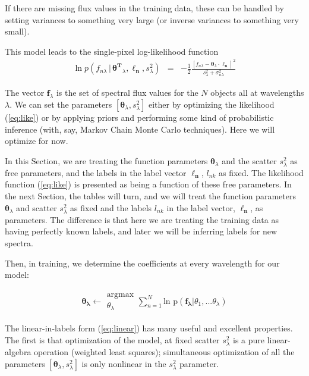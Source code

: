 \documentclass[12pt, preprint]{aastex}
\newcommand{\sectionname}{Section}
\newcommand{\set}[1]{\bm{#1}}
\newcommand{\given}{\,|\,}
\begin{document}
If there are missing flux values in the training data, these can be
handled by setting variances to something very large (or inverse
variances to something very small).

This model leads to the single-pixel log-likelihood function 
\begin{eqnarray}
\ln p(f_{n\lambda}\given\set{\theta^T}_\lambda, \boldsymbol{\ell_n}, s_\lambda^2) &=&
 -\frac{1}{2}\frac{[f_{n\lambda} - \set{\theta}_\lambda \cdot \set{\ell_n}]^2}{s_\lambda^2 + \sigma_{n\lambda}^2}
\label{eq:like}
\end{eqnarray}


The vector $\set{f}_\lambda$ is the set of spectral flux values for
the $N$ objects all at wavelengths $\lambda$.
We can set the parameters $[\set{\theta}_\lambda,s_\lambda^2]$ either by
optimizing the likelihood (\ref{eq:like}) or by applying priors and
performing some kind of probabilistic inference (with, say, Markov
Chain Monte Carlo techniques).
Here we will optimize for now.

In this \sectionname, we are treating the function parameters
$\set{\theta}_\lambda$ and the scatter $s_\lambda^2$ as free parameters, and the
labels in the label vector $\set{\ell_n}$, $l_{nk}$ as fixed.
The likelihood function (\ref{eq:like}) is presented as being a
function of these free parameters.
In the next \sectionname, the tables will turn, and we will treat the
function parameters $\set{\theta}_\lambda$ and scatter $s_{\lambda}^2$ as fixed and
the labels $l_{nk}$ in the label vector, $\set{\ell_n}$, as parameters.
The difference is that here we are treating the training data as
having perfectly known labels, and later we will be inferring labels for
new spectra.

Then, in training, we determine the coefficients at every wavelength for our model:

\begin{eqnarray}
\set{\theta_\lambda} \leftarrow \substack{\mbox{argmax}\\
{\theta_\lambda}  }
\sum_{n=1}^N \mbox{ln p}(\set{f_\lambda} | {\theta_1,...\theta_\lambda})
\end{eqnarray}

The linear-in-labels form (\ref{eq:linear}) has many useful and
excellent properties.
The first is that optimization of the model, at fixed scatter
$s_\lambda^2$ is a pure linear-algebra operation (weighted least
squares); simultaneous optimization of all the parameters
$[\set{\theta}_\lambda,s_\lambda^2]$ is only nonlinear in the $s_\lambda^2$
parameter.
\end{document}
